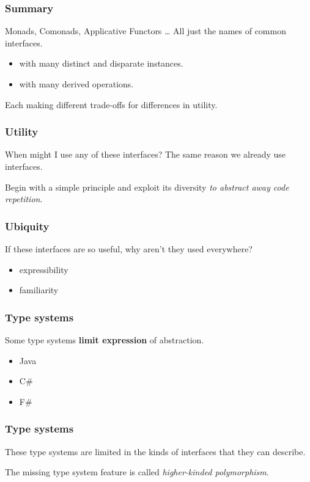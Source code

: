 \begin{frame}
\frametitle{Summary}
\begin{block}{Monads, Comonads, Applicative Functors \ldots}
All just the names of common interfaces.
\begin{itemize}
\item with many distinct and disparate instances.
\item with many derived operations.
\end{itemize}
Each making different trade-offs for differences in utility.
\end{block}
\end{frame}

\begin{frame}
\frametitle{Utility}
\begin{block}{When might I use any of these interfaces?}
The same reason we already use interfaces.
\end{block}
Begin with a simple principle and exploit its diversity \emph{to abstract away code repetition}.
\end{frame}

\begin{frame}
\frametitle{Ubiquity}
\begin{block}{If these interfaces are so useful, why aren't they used everywhere?}
\begin{itemize}
\item expressibility
\item familiarity
\end{itemize}
\end{block}
\end{frame}

\begin{frame}
\frametitle{Type systems}
\begin{block}{Some type systems \textbf{limit expression} of abstraction.}
\begin{itemize}
\item Java
\item C\#
\item F\#
\end{itemize}
\end{block}
\end{frame}

\begin{frame}
\frametitle{Type systems}
\begin{center}
These type systems are limited in the kinds of interfaces that they can describe.
\end{center}
\begin{center}
The missing type system feature is called \emph{higher-kinded polymorphism}.
\end{center}
\end{frame}

